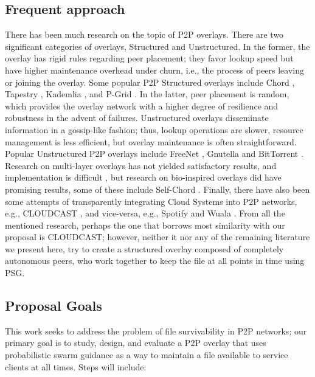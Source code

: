 \documentclass[runningheads]{llncs}
\begin{document}
\subsection
{Frequent approach}There has been much research on the topic of P2P overlays. There are two significant categories of overlays, Structured and Unstructured. In the former, the overlay has rigid rules regarding peer placement; they favor lookup speed but have higher maintenance overhead under churn, i.e., the process of peers leaving or joining the overlay. Some popular P2P Structured overlays include Chord \cite{chord}, Tapestry \cite{tapestry}, Kademlia \cite{kademlia}, and P-Grid \cite{pgrid}. In the latter, peer placement is random, which provides the overlay network with a higher degree of resilience and robustness in the advent of failures. Unstructured overlays disseminate information in a gossip-like fashion; thus, lookup operations are slower, resource management is less efficient, but overlay maintenance is often straightforward. Popular  Unstructured P2P overlays include FreeNet \cite{freenet}, Gnutella \cite{gnutella-rfc} and BitTorrent \cite{bittorrent}. Research on multi-layer overlays has not yielded satisfactory results, and implementation is difficult \cite{sotart}, but research on bio-inspired overlays did have promising results, some of these include Self-Chord \cite{selfchord}. Finally, there have also been some attempts of transparently integrating Cloud Systems into P2P networks, e.g., CLOUDCAST \cite{cloudcast}, and vice-versa, e.g., Spotify \cite{spotify} and Wuala \cite{wuala}. From all the mentioned research, perhaps the one that borrows most similarity with our proposal is CLOUDCAST; however, neither it nor any of the remaining literature we present here, try to create a structured overlay composed of completely autonomous peers, who work together to keep the file at all points in time using PSG.

\subsection{Proposal Goals}\label{subsec:intro}
This work seeks to address the problem of file survivability in P2P networks; our primary goal is to study, design, and evaluate a P2P overlay that uses probabilistic swarm guidance as a way to maintain a file available to service clients at all times. Steps will include:
\end{document}
